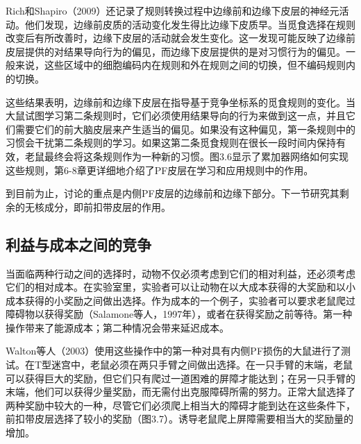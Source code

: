 Rich和Shapiro（2009）还记录了规则转换过程中边缘前和边缘下皮层的神经元活动。他们发现，边缘前皮质的活动变化发生得比边缘下皮质早。当觅食选择在规则改变后有所改善时，边缘下皮层的活动就会发生变化。这一发现可能反映了边缘前皮层提供的对结果导向行为的偏见，而边缘下皮层提供的是对习惯行为的偏见。一般来说，这些区域中的细胞编码内在规则和外在规则之间的切换，但不编码规则内的切换。\par
这些结果表明，边缘前和边缘下皮层在指导基于竞争坐标系的觅食规则的变化。当大鼠试图学习第二条规则时，它们必须使用结果导向的行为来做到这一点，并且它们需要它们的前大脑皮层来产生适当的偏见。如果没有这种偏见，第一条规则中的习惯会干扰第二条规则的学习。如果这第二条觅食规则在很长一段时间内保持有效，老鼠最终会将这条规则作为一种新的习惯。图3.6显示了累加器网络如何实现这些规则，第6-8章更详细地介绍了PF皮层在学习和应用规则中的作用。\par
到目前为止，讨论的重点是内侧PF皮层的边缘前和边缘下部分。下一节研究其剩余的无核成分，即前扣带皮层的作用。\par

\subsection{利益与成本之间的竞争}
当面临两种行动之间的选择时，动物不仅必须考虑到它们的相对利益，还必须考虑它们的相对成本。在实验室里，实验者可以让动物在以大成本获得的大奖励和以小成本获得的小奖励之间做出选择。作为成本的一个例子，实验者可以要求老鼠爬过障碍物以获得奖励（Salamone等人，1997年），或者在获得奖励之前等待\cite{Cardinal et al,2001}。第一种操作带来了能源成本；第二种情况会带来延迟成本。\par
Walton等人（2003）使用这些操作中的第一种对具有内侧PF损伤的大鼠进行了测试。在T型迷宫中，老鼠必须在两只手臂之间做出选择。在一只手臂的末端，老鼠可以获得巨大的奖励，但它们只有爬过一道困难的屏障才能达到；在另一只手臂的末端，他们可以获得少量奖励，而无需付出克服障碍所需的努力。正常大鼠选择了两种奖励中较大的一种，尽管它们必须爬上相当大的障碍才能到达在这些条件下，前扣带皮层选择了较小的奖励（图3.7）。诱导老鼠爬上屏障需要相当大的奖励量的增加\cite{Walton et al 2002}。\par

